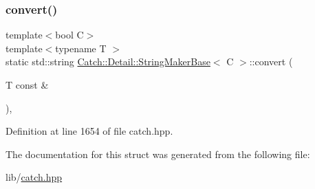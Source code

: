 \subsubsection{\texorpdfstring{convert()}{convert()}}
{\footnotesize\ttfamily template$<$bool C$>$ \\
template$<$typename T $>$ \\
static std\+::string \hyperlink{struct_catch_1_1_detail_1_1_string_maker_base}{Catch\+::\+Detail\+::\+String\+Maker\+Base}$<$ C $>$\+::convert (\begin{DoxyParamCaption}\item[{T const \&}]{ }\end{DoxyParamCaption})\hspace{0.3cm}{\ttfamily [inline]}, {\ttfamily [static]}}



Definition at line 1654 of file catch.\+hpp.



The documentation for this struct was generated from the following file\+:\begin{DoxyCompactItemize}
\item 
lib/\hyperlink{catch_8hpp}{catch.\+hpp}\end{DoxyCompactItemize}
